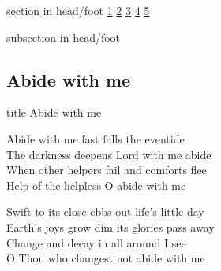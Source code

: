 \documentclass{beamer}
\begin{document}
{
{ 
 {
 \begin{beamercolorbox}[ht=4.5ex,dp=1.5ex,%
      leftskip=.3cm,rightskip=.3cm plus1fil]{section in head/foot}
 \fontsize{12}{25}\selectfont 
\hyperlink{Abide with me[]1}{1}
\hyperlink{Abide with me[]2}{2}
\hyperlink{Abide with me[]3}{3}
\hyperlink{Abide with me[]4}{4}
\hyperlink{Abide with me[]5}{5}
 
 \end{beamercolorbox}%
  \begin{beamercolorbox}[ht=2.5ex,dp=1.125ex,%
   leftskip=.3cm,rightskip=.3cm plus1fil]{subsection in head/foot}
   \insertauthor
 \end{beamercolorbox}%
 }
}
\subsection{ Abide with me }

\hypertarget{Abide with me[]}{}
\begin{frame}{}
 \vfill
  \centering
  \begin{beamercolorbox}[sep=8pt,center,shadow=true,rounded=true]{title}
    Abide with me    
  \end{beamercolorbox}
  \vfill
\end{frame}

\hypertarget{Abide with me[]1}{}
\begin{frame}{}
\fontsize{ 15 }{ 19 }\selectfont

Abide with me fast falls the eventide\\ 
The darkness deepens Lord with me abide\\ 
When other helpers fail and comforts flee\\ 
Help of the helpless O abide with me 

\end{frame}

\hypertarget{Abide with me[]2}{}
\begin{frame}{}
\fontsize{ 15 }{ 19 }\selectfont

Swift to its close ebbs out life's little day\\ 
Earth's joys grow dim its glories pass away\\ 
Change and decay in all around I see\\ 
O Thou who changest not abide with me 

\end{frame}

}
\end{document}
